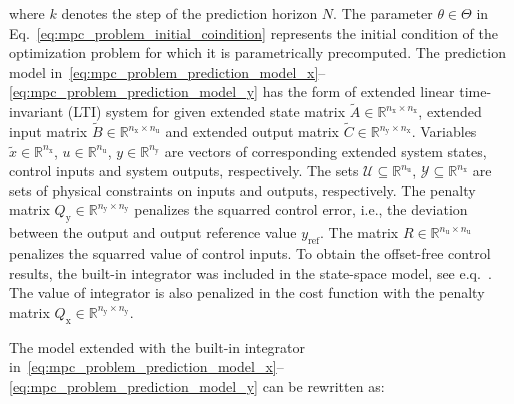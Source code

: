 \documentclass[preprint,12pt]{elsarticle}
\begin{document}
where $k$ denotes the step of the prediction horizon $N$. The parameter $\theta \in \Theta$ in Eq.~\eqref{eq:mpc_problem_initial_coindition} represents the initial condition of the optimization problem for which it is parametrically precomputed. The prediction model in~\eqref{eq:mpc_problem_prediction_model_x}--\eqref{eq:mpc_problem_prediction_model_y} has the form of extended linear time-invariant (LTI) system for given extended state matrix $\widetilde{A} \in \mathbb{R}^{n_{\mathrm{x}} \times n_{\mathrm{x}}}$, extended input matrix $\widetilde{B} \in \mathbb{R}^{n_{\mathrm{x}} \times n_{\mathrm{u}}}$ and extended output matrix $\widetilde{C} \in \mathbb{R}^{n_{\mathrm{y}} \times n_{\mathrm{x}}}$. Variables $\widetilde{x} \in \mathbb{R}^{n_{\mathrm{x}}}$, $u \in \mathbb{R}^{n_{\mathrm{u}}}$, $y \in \mathbb{R}^{n_{\mathrm{y}}}$ are vectors of corresponding extended system states, control inputs and system outputs, respectively. The sets $\mathcal{U} \subseteq \mathbb{R}^{n_{\mathrm{u}}}$, $\mathcal{Y} \subseteq \mathbb{R}^{n_{\mathrm{x}}}$ are sets of physical constraints on inputs and outputs, respectively. The penalty matrix $Q_\mathrm{y} \in \mathbb{R}^{n_{\mathrm{y}} \times n_{\mathrm{y}}}$ penalizes the squarred control error, i.e., the deviation between the output and output reference value $y_\mathrm{ref}$. The matrix $R \in \mathbb{R}^{n_{\mathrm{u}} \times n_{\mathrm{u}}}$ penalizes the squarred value of control inputs. To obtain the offset-free control results, the built-in integrator was included in the state-space model, see e.q.~\cite{Ruscio_MPC_integral}. The value of integrator is also penalized in the cost function with the penalty matrix $Q_\mathrm{x} \in \mathbb{R}^{n_{\mathrm{y}} \times n_{\mathrm{y}}}$.

The model extended with the built-in integrator in~\eqref{eq:mpc_problem_prediction_model_x}--\eqref{eq:mpc_problem_prediction_model_y} can be rewritten as:
\end{document}

